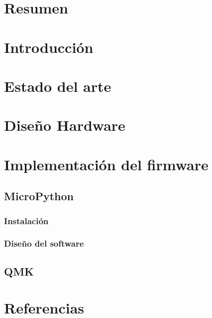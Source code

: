 


	


  \chapter*{Resumen}
    

  \tableofcontents \label{chapter:contents}

  \chapter{Introducción}
    

  \chapter{Estado del arte}
    
  
  \chapter{Diseño Hardware}
  

	\chapter{Implementación del firmware}
    \section{MicroPython}
      \subsection{Instalación}
	 	    
      \subsection{Diseño del software}
        
        
    \section{QMK}    

  \chapter{Referencias}      
    \printbibliography[heading=none]

